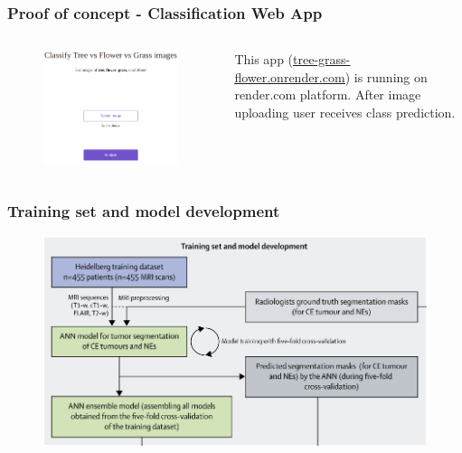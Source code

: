 \documentclass{beamer}
\begin{document}
\begin{frame}
\frametitle{Proof of concept - Classification Web App}
\begin{columns}
	\begin{column}{0.55\textwidth}
		\begin{figure}
			\centering
			\includegraphics[width=1.0\textwidth]{images/render_classifier.png}
		\end{figure}
	\end{column}
	\begin{column}{0.45\textwidth}
		This app (\href{https://tree-grass-flower.onrender.com/}{{\color{blue}\underline{tree-grass-flower.onrender.com}}}) is running on render.com platform. After image uploading user receives class prediction.
	\end{column}
\end{columns}
\end{frame}


\begin{frame}
\frametitle{Training set and model development}
\begin{figure}
	\centering
	\includegraphics[width=\textwidth]{images/process_training.png}
\end{figure}
\end{frame}
\end{document}

